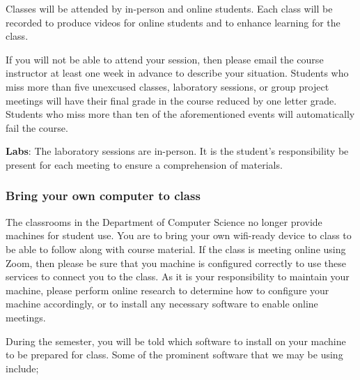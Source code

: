 \documentclass[11pt]{article} %
\begin{document}
Classes will be attended by in-person and online students. Each class will be recorded to produce videos for online students and to enhance learning for the class.


If you will not be able to attend your session, then please email the course instructor at least one week in advance to describe your situation.  Students who miss more than five unexcused classes, laboratory sessions, or group project meetings will have their final grade in the course reduced by one letter grade. Students who miss more than ten of the aforementioned events will automatically fail the course.


\textbf{Labs}: The laboratory sessions are in-person. It is the student's responsibility be present for each meeting to ensure a comprehension of materials. 

\subsubsection*{\textbf{Bring your own computer to class}}

The classrooms in the Department of Computer Science no longer provide machines for student use. You are to bring your own wifi-ready device to class to be able to follow along with course material. If the class is meeting online using Zoom, then please be sure that you machine is configured correctly to use these services to connect you to the class. As it is your responsibility to maintain your machine, please perform online research to determine how to configure your machine accordingly, or to install any necessary software to enable online meetings. 

During the semester, you will be told which software to install on your machine to be prepared for class. Some of the prominent software that we may be using include;
\end{document}
